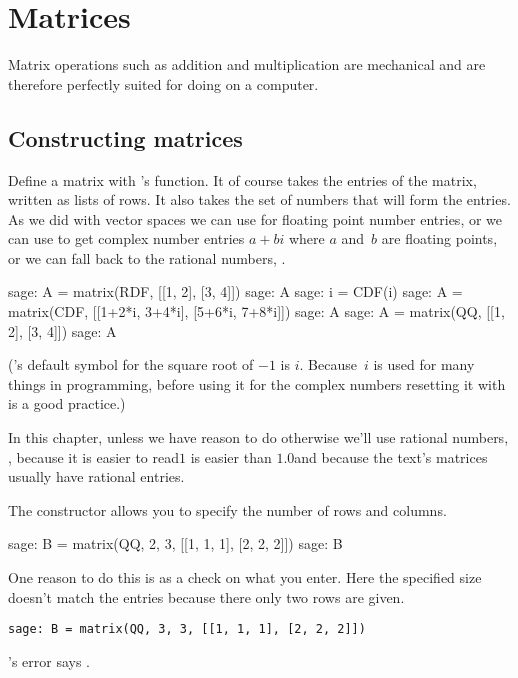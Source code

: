 \chapter{Matrices}

Matrix operations such as addition and multiplication
are mechanical and are therefore perfectly suited for doing on 
a computer.



\section{Constructing matrices}
Define a matrix with \Sage's  function.
It of course takes the entries of the matrix, written as lists of rows.
It also takes the set of numbers that will form the entries.
As we did with vector spaces we can use  for 
floating point number entries, 
or we can use  to get complex number entries $a+bi$ where 
$a$ and~$b$ are floating points,
or we can fall back to the rational numbers, .
\begin{sagecommandline}
sage: A = matrix(RDF, [[1, 2], [3, 4]])
sage: A
sage: i = CDF(i)
sage: A = matrix(CDF, [[1+2*i, 3+4*i], [5+6*i, 7+8*i]])
sage: A
sage: A = matrix(QQ, [[1, 2], [3, 4]])
sage: A                           
\end{sagecommandline}
(\Sage's default symbol for the square root of $-1$ is $i$. 
Because~$i$ is used for many things in programming,
before using it for the complex numbers
resetting it with  is a good practice.)

In this chapter, unless we have reason to do otherwise
we'll use rational numbers, , 
because it is easier to read\Dash $1$ is easier than $1.0$\Dash and 
because the text's matrices usually have rational entries.

The  constructor allows you to specify the number of
rows and columns.
\begin{sagecommandline}
sage: B = matrix(QQ, 2, 3, [[1, 1, 1], [2, 2, 2]])  
sage: B
\end{sagecommandline}
One reason to do this is as a check on what you enter.
Here the specified size doesn't match the entries because
there only two rows are given. 
\begin{lstlisting}[style=python]
sage: B = matrix(QQ, 3, 3, [[1, 1, 1], [2, 2, 2]])  
\end{lstlisting}
\Sage's error says
.

